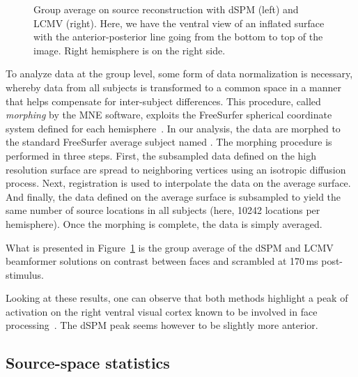 \begin{figure}
\begin{minipage}{0.4\linewidth}
\end{minipage}
\caption[Group average on source reconstruction with dSPM and LCMV.]{Group average on source reconstruction with dSPM (left) and LCMV (right). Here, we have the ventral view of an inflated surface with the anterior-posterior line going from the bottom to top of the image. Right hemisphere is on the right side.}
\label{fig:fig_stc}
\end{figure}

To analyze data at the group level, some form of data normalization is necessary, whereby data from all subjects is transformed to a common space in a manner that helps compensate for inter-subject differences. This procedure, called \emph{morphing} by the MNE software, exploits the FreeSurfer spherical coordinate system defined for each hemisphere~\citep{dale-fischl-etal:99,fischl-serena-etal:99}. In our analysis, the data are morphed to the standard FreeSurfer average subject named . The morphing procedure is performed in three steps. First, the subsampled data defined on the high resolution surface are spread to neighboring vertices using an isotropic diffusion process. Next, registration is used to interpolate the data on the average surface. And finally, the data defined on the average surface is subsampled to yield the same number of source locations in all subjects (here, 10242 locations per hemisphere). Once the morphing is complete, the data is simply averaged.

What is presented in Figure~\ref{fig:fig_stc} is the group average of the dSPM and LCMV beamformer solutions on contrast between faces and scrambled
at 170\,ms post-stimulus.

Looking at these results, one can observe that both methods highlight a peak of activation on the right ventral visual cortex known to be involved in face processing~\citep{grill2017functional,grill2004fusiform,wakeman2015multi}. The dSPM peak seems however to be slightly more anterior.

\subsection{Source-space statistics}

